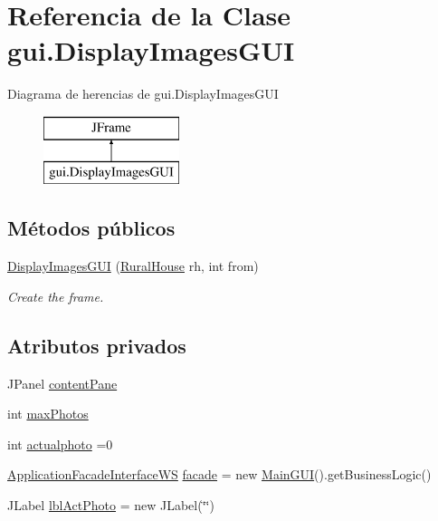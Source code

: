\hypertarget{classgui_1_1_display_images_g_u_i}{}\section{Referencia de la Clase gui.\+Display\+Images\+G\+UI}
\label{classgui_1_1_display_images_g_u_i}
Diagrama de herencias de gui.\+Display\+Images\+G\+UI\begin{figure}[H]
\begin{center}
\leavevmode
\includegraphics[height=2.000000cm]{classgui_1_1_display_images_g_u_i}
\end{center}
\end{figure}
\subsection*{Métodos públicos}
\begin{DoxyCompactItemize}
\item 
\mbox{\hyperlink{classgui_1_1_display_images_g_u_i_aec52199fa3d22a15985d9b80ecc09934}{Display\+Images\+G\+UI}} (\mbox{\hyperlink{classdomain_1_1_rural_house}{Rural\+House}} rh, int from)
\begin{DoxyCompactList}\small\item\em Create the frame. \end{DoxyCompactList}\end{DoxyCompactItemize}
\subsection*{Atributos privados}
\begin{DoxyCompactItemize}
\item 
J\+Panel \mbox{\hyperlink{classgui_1_1_display_images_g_u_i_af5565c2bb3ed37878d4812250658e895}{content\+Pane}}
\item 
int \mbox{\hyperlink{classgui_1_1_display_images_g_u_i_a3f6072ee462364a095f2702fbcb14e17}{max\+Photos}}
\item 
int \mbox{\hyperlink{classgui_1_1_display_images_g_u_i_a67ed3018c207bc52f5eceb196b02d74a}{actualphoto}} =0
\item 
\mbox{\hyperlink{interfacebusiness_logic_1_1_application_facade_interface_w_s}{Application\+Facade\+Interface\+WS}} \mbox{\hyperlink{classgui_1_1_display_images_g_u_i_ae5514a460e8af8bc6293278b62791832}{facade}} = new \mbox{\hyperlink{classgui_1_1_main_g_u_i}{Main\+G\+UI}}().get\+Business\+Logic()
\item 
J\+Label \mbox{\hyperlink{classgui_1_1_display_images_g_u_i_a07b3c804bf0847f00977fac829fb092e}{lbl\+Act\+Photo}} = new J\+Label(\char`\"{}\char`\"{})
\end{DoxyCompactItemize}


